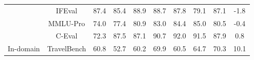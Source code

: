 \documentclass{article} %
\begin{document}
\begin{table}[h]
{\begin{tabular}{@{}cccccccccc@{}}
                          & IFEval           & 87.4                                                              & 85.4      & 88.9                                                          & 88.7                                                                & 87.8                                                               & 79.1                                                        & 87.1    & -1.8  \\
                          & MMLU-Pro         & 74.0                                                              & 77.4      & 80.9                                                          & 83.0                                                                & 84.4                                                               & 85.0                                                          & 80.5    & -0.4  \\
                          & C-Eval           & 72.3                                                              & 87.5      & 87.1                                                          & 90.7                                                                & 92.0                                                               & 91.5                                                        & 87.9    & 0.8   \\ \midrule
In-domain                 & TravelBench      & 60.8                                                              & 52.7      & 60.2                                                          & 69.9                                                                & 60.5                                                               & 64.7                                                        & 70.3    & 10.1  \\ \bottomrule
\end{tabular}
}
\end{table}
\end{document}
